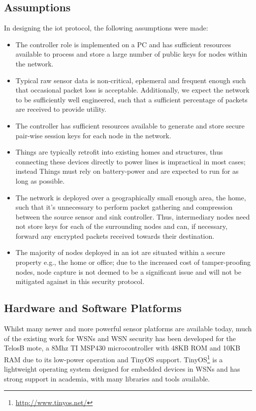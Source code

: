 \documentclass{mpaper}
\begin{document}
\subsection{Assumptions} %
\label{sub:assumptions}
In designing the iot protocol, the following assumptions were made:
\begin{itemize}
  \item The controller role is implemented on a PC and has sufficient resources available to process and store a large number of public keys for nodes within the network.
  \item Typical raw sensor data is non-critical, ephemeral and frequent enough such that occasional packet loss is acceptable. Additionally, we expect the network to be sufficiently well engineered, such that a sufficient percentage of packets are received to provide utility.
  \item The controller has sufficient resources available to generate and store secure pair-wise session keys for each node in the network.
  \item Things are typically retrofit into existing homes and structures, thus connecting these devices directly to power lines is impractical in most cases; instead Things must rely on battery-power and are expected to run for as long as possible.  
  \item The network is deployed over a geographically small enough area, the home, such that it's unnecessary to perform packet gathering and compression between the source sensor and sink controller. Thus, intermediary nodes need not store keys for each of the surrounding nodes and can, if necessary, forward any encrypted packets received towards their destination.
  \item The majority of nodes deployed in an iot are situated within a secure property e.g., the home or office; due to the increased cost of tamper-proofing nodes, node capture is not deemed to be a significant issue and will not be mitigated against in this security protocol.
\end{itemize}

\subsection{Hardware and Software Platforms} %
\label{sec:hardware_and_software_platforms}
Whilst many newer and more powerful sensor platforms are available today, much of the existing work for WSNs and WSN security has been developed for the TelosB mote, a 8Mhz TI MSP430 microcontroller with 48KB ROM and 10KB RAM due to its low-power operation and TinyOS support. TinyOS\footnote{\url{http://www.tinyos.net/}} is a lightweight operating system designed for embedded devices in WSNs and has strong support in academia, with many libraries and tools available. 
\end{document}
